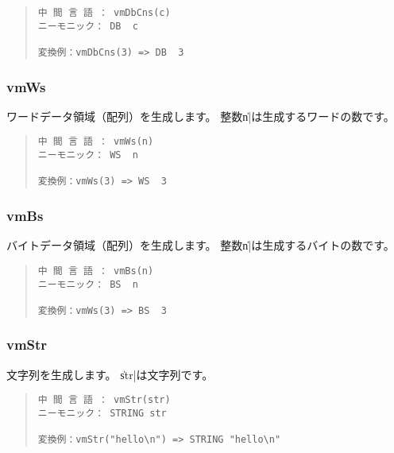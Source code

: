\begin{quote}
\begin{verbatim}
中 間 言 語 ： vmDbCns(c)
ニーモニック： DB  c   

変換例：vmDbCns(3) => DB  3
\end{verbatim}
\end{quote}

\subsubsection{vmWs}

ワードデータ領域（配列）を生成します。
整数\|n|は生成するワードの数です。

\begin{quote}
\begin{verbatim}
中 間 言 語 ： vmWs(n)
ニーモニック： WS  n

変換例：vmWs(3) => WS  3
\end{verbatim}
\end{quote}

\subsubsection{vmBs}

バイトデータ領域（配列）を生成します。
整数\|n|は生成するバイトの数です。

\begin{quote}
\begin{verbatim}
中 間 言 語 ： vmBs(n)
ニーモニック： BS  n

変換例：vmWs(3) => BS  3
\end{verbatim}
\end{quote}

\subsubsection{vmStr}

文字列を生成します。
\|str|は文字列です。

\begin{quote}
\begin{verbatim}
中 間 言 語 ： vmStr(str)
ニーモニック： STRING str

変換例：vmStr("hello\n") => STRING "hello\n"
\end{verbatim}
\end{quote}
